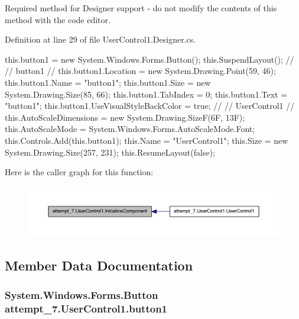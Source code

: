 Required method for Designer support -\/ do not modify the contents of this method with the code editor. 



Definition at line 29 of file UserControl1.Designer.cs.


\begin{DoxyCode}
        {
            this.button1 = new System.Windows.Forms.Button();
            this.SuspendLayout();
            // 
            // button1
            // 
            this.button1.Location = new System.Drawing.Point(59, 46);
            this.button1.Name = "button1";
            this.button1.Size = new System.Drawing.Size(85, 66);
            this.button1.TabIndex = 0;
            this.button1.Text = "button1";
            this.button1.UseVisualStyleBackColor = true;
            // 
            // UserControl1
            // 
            this.AutoScaleDimensions = new System.Drawing.SizeF(6F, 13F);
            this.AutoScaleMode = System.Windows.Forms.AutoScaleMode.Font;
            this.Controls.Add(this.button1);
            this.Name = "UserControl1";
            this.Size = new System.Drawing.Size(257, 231);
            this.ResumeLayout(false);

        }
\end{DoxyCode}


Here is the caller graph for this function:\nopagebreak
\begin{figure}[H]
\begin{center}
\leavevmode
\includegraphics[width=400pt]{classattempt__7_1_1_user_control1_aa7f26c54a6a74eb25d099636d8af3678_icgraph}
\end{center}
\end{figure}




\subsection{Member Data Documentation}
\subsubsection[{button1}]{\setlength{\rightskip}{0pt plus 5cm}System.Windows.Forms.Button {\bf attempt\_\-7.UserControl1.button1}\hspace{0.3cm}{\ttfamily  [private]}}\label{classattempt__7_1_1_user_control1_aae769dedffbcdb731a06dfd1b1aadea8}



